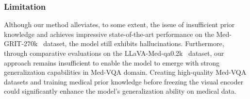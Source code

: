 \subsubsection{Limitation}
Although our method alleviates, to some extent, the issue of insufficient prior knowledge and achieves impressive state-of-the-art performance on the Med-GRIT-270k~\cite{ye2023samed2d20m, cheng2023sammed2d} dataset, the model still exhibits hallucinations. Furthermore, through comparative evaluations on the LLaVA-Med-qa0.2k~\cite{zhang2025biomedclipmultimodalbiomedicalfoundation} dataset, our approach remains insufficient to enable the model to emerge with strong generalization capabilities in Med-VQA domain. Creating high-quality Med-VQA datasets and training medical prior knowledge before freezing the visual encoder could significantly enhance the model's generalization ability on medical data.

